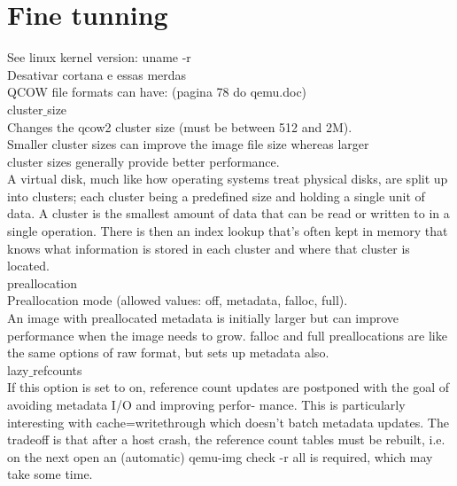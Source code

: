 \documentclass[11pt, a4paper, oneside]{article}
\theoremstyle{definition}
\begin{document}
\vfill
\pagebreak
\section{Fine tunning}

See linux kernel version: uname -r\\
Desativar cortana e essas merdas\\

QCOW file formats can have: (pagina 78 do qemu.doc)\\
cluster$\_$size\\
Changes the qcow2 cluster size (must be between 512 and 2M).\\
Smaller cluster sizes can improve the image file size whereas larger\\
cluster sizes generally provide better performance.\\

A virtual disk, much like how operating systems treat physical disks, are split up into clusters; each cluster being a predefined size and holding a single unit of data. A cluster is the smallest amount of data that can be read or written to in a single operation. There is then an index lookup that’s often kept in memory that knows what information is stored in each cluster and where that cluster is located.\\

preallocation\\
Preallocation mode (allowed values: off, metadata, falloc, full).\\
An image with preallocated metadata is initially larger but can
improve performance when the image needs to grow. falloc and
full preallocations are like the same options of raw format, but
sets up metadata also.\\

lazy$\_$refcounts\\
If this option is set to on, reference count updates are postponed
with the goal of avoiding metadata I/O and improving perfor-
mance. This is particularly interesting with cache=writethrough
which doesn’t batch metadata updates. The tradeoff is that after
a host crash, the reference count tables must be rebuilt, i.e. on
the next open an (automatic) qemu-img check -r all is required,
which may take some time.\\
\end{document}
